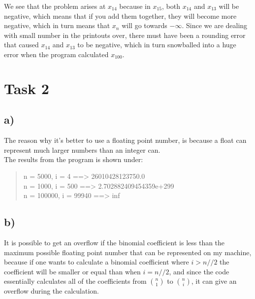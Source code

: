 \documentclass{article}
\begin{document}
We see that the problem arises at $x_{14}$ because in $x_{15}$, both $x_{14}$ and $x_{13}$ will be negative, which means that if you add them together, they will become more negative, which in turn means that $x_n$ will go towards $-\infty$.
Since we are dealing with small number in the printouts over, there must have been a rounding error that caused $x_{14}$ and $x_{13}$ to be negative, which in turn snowballed into a huge error when the program calculated $x_{100}$.

\newpage

\section*{Task 2}
\subsection*{a)}


The reason why it's better to use a floating point number, is because a float can represent 
much larger numbers than an integer can. \\
The results from the program is shown under: \\

\begin{quote}
    n =   5000, i =     4 ==> 26010428123750.0 \\
    n =   1000, i =   500 ==> 2.702882409454359e+299 \\
    n = 100000, i = 99940 ==> inf \\
\end{quote}

\subsection*{b)}
It is possible to get an overflow if the binomial coefficient is less than the maximum possible
floating point number that can be represented on my machine, because if one wants to calculate a binomial
coefficient where $i > n//2$ the coefficient will be smaller or equal than when $i = n//2$, and since the code essentially
calculates all of the coefficients from ${n \choose 1}$ to ${n \choose i}$, it can give an overflow during the calculation.
\end{document}
